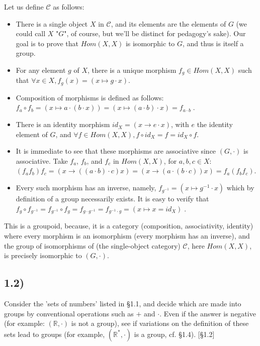 Let us define $\mathcal{C}$ as follows:
\begin{itemize}
	\item There is a single object $X$ in $\mathcal{C}$, and its elements are the elements of $G$ (we could call $X$ "$G$", of course, but we'll be distinct for pedagogy's sake). Our goal is to prove that $Hom(X, X)$ is isomorphic to $G$, and thus is itself a group.
	\item For any element $g$ of $X$, there is a unique morphism $f_g \in Hom(X, X)$ such that $\forall x \in X, f_g(x) = (x \mapsto g \cdot x)$.
	\item Composition of morphisms is defined as follows: $f_a \circ f_b = (x \mapsto a \cdot (b \cdot x)) = (x \mapsto (a \cdot b) \cdot x) = f_{a \cdot b} \;$.
	\item There is an identity morphism $id_X = (x \to e \cdot x)$, with $e$ the identity element of $G$, and $\forall f \in Hom(X, X), f \circ id_X = f = id_X \circ f$.
	\item It is immediate to see that these morphisms are associative since $(G, \cdot)$ is associative. Take $f_a$, $f_b$, and $f_c$ in $Hom(X,X)$, for $a,b,c \in X$: $(f_a f_b) f_c = (x \to ((a \cdot b) \cdot c) x) = (x \to (a \cdot (b \cdot c))x) = f_a (f_b f_c)$.
	\item Every such morphism has an inverse, namely, $f_{g^{-1}} = (x \mapsto g^{-1} \cdot x)$ which by definition of a group necessarily exists. It is easy to verify that $f_g \circ f_{g^{-1}} = f_{g^{-1}} \circ f_g = f_{g \cdot g^{-1}} = f_{g^{-1} \cdot g} = (x \mapsto x = id_X) \;$.
\end{itemize}

This is a groupoid, because, it is a category (composition, associativity, identity) where every morphism is an isomorphism (every morphism has an inverse), and the group of isomorphisms of (the single-object category) $\mathcal{C}$, here $Hom(X,X)$, is precisely isomorphic to $(G, \cdot)$.


\subsection*{1.2)}

Consider the 'sets of numbers' listed in §1.1, and decide which are made into groups by conventional operations such as $+$ and $\cdot$. Even if the answer is negative (for example: $(\mathbb{R}, \cdot)$ is not a group), see if variations on the definition of these sets lead to groups (for example, $(\mathbb{R}^*, \cdot)$ is a group, cf. §1.4). [§1.2]

